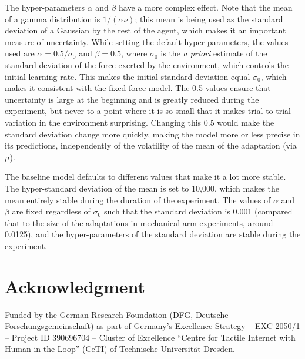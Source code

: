 \documentclass[a4paper,doc,floatsintext,natbib]{apa6}
\begin{document}
The hyper-parameters $\alpha$ and $\beta$ have a more complex effect. Note that
the mean of a gamma distribution is $1 / (\alpha \nu)$; this mean is being used
as the standard deviation of a Gaussian by the rest of the agent, which makes
it an important measure of uncertainty. While setting the default
hyper-parameters, the values used are $\alpha = 0.5 / \sigma_0$ and
$\beta = 0.5$, where $\sigma_0$ is the \textit{a priori} estimate of the
standard deviation of the force exerted by the environment, which controls the
initial learning rate. This makes the initial standard deviation equal
$\sigma_0$, which makes it consistent with the fixed-force model. The 0.5
values ensure that uncertainty is large at the beginning and is greatly reduced
during the experiment, but never to a point where it is so small that it makes
trial-to-trial variation in the environment surprising. Changing this 0.5 would
make the standard deviation change more quickly, making the model more or less
precise in its predictions, independently of the volatility of the mean of the
adaptation (via $\mu$).

The baseline model defaults to different values that make it a lot more
stable. The hyper-standard deviation of the mean is set to 10,000, which makes
the mean entirely stable during the duration of the experiment. The values of
$\alpha$ and $\beta$ are fixed regardless of $\sigma_0$ such that the standard
deviation is 0.001 (compared that to the size of the adaptations in mechanical
arm experiments, around 0.0125), and the hyper-parameters of the standard
deviation are stable during the experiment.


\section{Acknowledgment}
Funded by the German Research Foundation (DFG, Deutsche Forschungsgemeinschaft) as part of Germany’s Excellence Strategy – EXC 2050/1 – Project ID 390696704 – Cluster of Excellence “Centre for Tactile Internet with Human-in-the-Loop” (CeTI) of Technische Universität Dresden.


\end{document}
